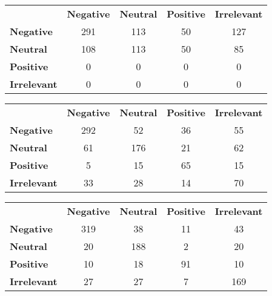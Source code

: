 \documentclass[10pt]{amsart}
\theoremstyle{definition}
\begin{document}
\begin{tabular}{lcccc}
  {} & {\bf Negative} & {\bf Neutral} & {\bf Positive} & {\bf Irrelevant}\\
  {\bf Negative}   & {291} & {113} & {50} & {127}\\
  {\bf Neutral}    & {108} & {113} & {50} & {85}\\
  {\bf Positive}   & {0} & {0} & {0} & {0}\\
  {\bf Irrelevant} & {0} & {0} & {0} & {0}\\
\end{tabular}




\begin{tabular}{lcccc}
  {} & {\bf Negative} & {\bf Neutral} & {\bf Positive} & {\bf Irrelevant}\\
  {\bf Negative}   & {292} & {52} & {36} & {55}\\
  {\bf Neutral}    & {61} & {176} & {21} & {62}\\
  {\bf Positive}   & {5} & {15} & {65} & {15}\\
  {\bf Irrelevant} & {33} & {28} & {14} & {70}\\
\end{tabular}





\begin{tabular}{lcccc}
  {} & {\bf Negative} & {\bf Neutral} & {\bf Positive} & {\bf Irrelevant}\\
  {\bf Negative}   & {319} & {38} & {11} & {43}\\
  {\bf Neutral}    & {20} & {188} & {2} & {20}\\
  {\bf Positive}   & {10} & {18} & {91} & {10}\\
  {\bf Irrelevant} & {27} & {27} & {7} & {169}\\
\end{tabular}
\end{document}
